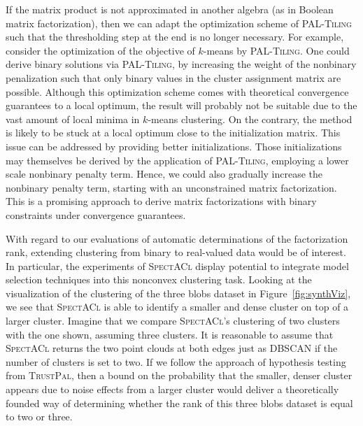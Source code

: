 If the matrix product is not approximated in another algebra (as in Boolean matrix factorization), then we can adapt the optimization scheme of \textsc{PAL-Tiling} such that the thresholding step at the end is no longer necessary. For example, consider the optimization of the objective of $k$-means by \textsc{PAL-Tiling}. One could derive binary solutions via \textsc{PAL-Tiling}, by increasing the weight of the nonbinary penalization such that only binary values in the cluster assignment matrix are possible. Although this optimization scheme comes with theoretical convergence guarantees to a local optimum, the result will probably not be suitable due to the vast amount of local minima in $k$-means clustering. On the contrary, the method is likely to be stuck at a local optimum close to the initialization matrix. This issue can be addressed by providing better initializations. Those initializations may themselves be derived by the application of \textsc{PAL-Tiling}, employing a lower scale nonbinary penalty term. Hence, we could also gradually increase the nonbinary penalty term, starting with an unconstrained matrix factorization. This is a promising approach to derive matrix factorizations with binary constraints under convergence guarantees.  

With regard to our evaluations of automatic determinations of the factorization rank, extending clustering from binary to real-valued data would be of interest. In particular, the experiments of \textsc{SpectACl} display potential to integrate model selection techniques into this nonconvex clustering task. Looking at the visualization of the clustering of the three blobs dataset in Figure~\ref{fig:synthViz}, we see that \textsc{SpectACl} is able to identify a smaller and dense cluster on top of a larger cluster. Imagine that we compare \textsc{SpectACl}'s clustering of two clusters with the one shown, assuming three clusters. It is reasonable to assume that \textsc{SpectACl} returns the two point clouds at both edges just as DBSCAN if the number of clusters is set to two. If we follow the approach of hypothesis testing from \textsc{TrustPal}, then a bound on the probability that the smaller, denser cluster appears due to noise effects from a larger cluster would deliver a theoretically founded way of determining whether the rank of this three blobs dataset is equal to two or three.